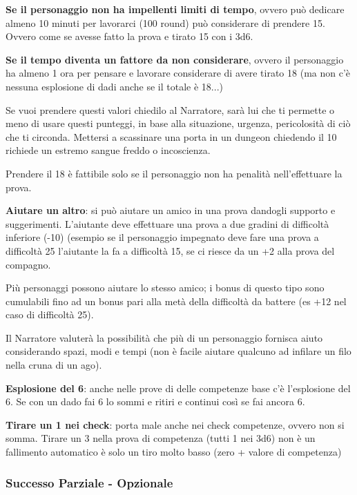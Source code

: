 \documentclass[a4paper,11pt,twoside,openany]{book}
\begin{document}
\textbf{Se il personaggio non ha impellenti limiti di tempo}, ovvero può dedicare almeno 10 minuti per lavorarci (100 round) può considerare di prendere 15. Ovvero come se avesse fatto la prova e tirato 15 con i 3d6.

\textbf{Se il tempo diventa un fattore da non considerare}, ovvero il personaggio ha almeno 1 ora per pensare e lavorare considerare di avere tirato 18 (ma non c'è nessuna esplosione di dadi anche se il totale è 18...)

Se vuoi prendere questi valori chiedilo al Narratore, sarà lui che ti permette o meno di usare questi punteggi, in base alla situazione, urgenza, pericolosità di ciò che ti circonda. Mettersi a scassinare una porta in un dungeon chiedendo il 10 richiede un estremo sangue freddo o incoscienza.


Prendere il 18 è fattibile solo se il personaggio non ha penalità nell'effettuare la prova.

\textbf{Aiutare un altro}: si può aiutare un amico in una prova dandogli supporto e suggerimenti. L'aiutante deve effettuare una prova a due gradini di difficoltà inferiore (-10) (esempio se il personaggio impegnato deve fare una prova a difficoltà 25 l'aiutante la fa a difficoltà 15, se ci riesce da un +2 alla prova del compagno.


Più personaggi possono aiutare lo stesso amico; i bonus di questo tipo sono cumulabili fino ad un bonus pari alla metà della difficoltà da battere (es +12 nel caso di difficoltà 25).

Il Narratore valuterà la possibilità che più di un personaggio fornisca aiuto considerando spazi, modi e tempi (non è facile aiutare qualcuno ad infilare un filo nella cruna di un ago).

\textbf{Esplosione del 6}: anche nelle prove di delle competenze base c'è l'esplosione del 6. Se con un dado fai 6 lo sommi e ritiri e continui così se fai ancora 6.

\textbf{Tirare un 1 nei check}: porta male anche nei check competenze, ovvero non si somma.
Tirare un 3 nella prova di competenza (tutti 1 nei 3d6) non è un fallimento automatico è solo un tiro molto basso (zero + valore di competenza)

\subsubsection{Successo Parziale - Opzionale}
\end{document}
